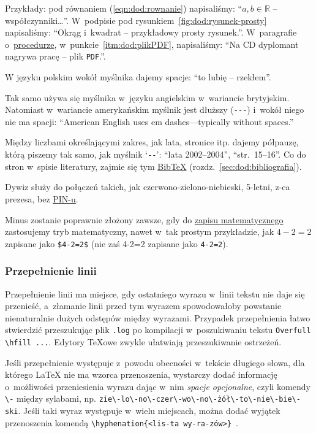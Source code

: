 Przykłady: pod równaniem (\ref{eqn:dod:rownanie}) napisaliśmy: ``$a, b \in \mathbb{R}$ -- współczynniki\dots''. W~podpisie pod rysunkiem~\ref{fig:dod:rysunek-prosty} napisaliśmy: ``Okrąg i~kwadrat -- przykładowy prosty rysunek.''. W~paragrafie o~\hyperref[sec:dod:procedura]{procedurze}, w~punkcie~\ref{itm:dod:plikPDF}, napisaliśmy: ``Na CD dyplomant nagrywa pracę -- plik {\tt PDF}.''.

W języku polskim wokół myślnika dajemy spacje: ``to lubię -- rzekłem''. 

Tak samo używa się myślnika w~języku angielskim w~wariancie brytyjskim. Natomiast w~wariancie amerykańskim myślnik jest dłuższy (\verb+---+) i~wokół niego nie ma spacji: ``American English uses em dashes---typically without spaces.''

Między liczbami określającymi zakres, jak lata, stronice itp. dajemy półpauzę, którą piszemy tak samo, jak myślnik `\verb+--+': ``lata 2002--2004'', ``str.\ 15--16''. Co do stron w~spisie literatury, zajmie się tym \hyperref[sec:dod:bibliografia]{Bib\TeX} (rozdz.~\ref{sec:dod:bibliografia}).

Dywiz służy do połączeń takich, jak czerwono-zielono-niebieski, 5-letni, z-ca prezesa, bez \hyperref[sec:dod:apostrof-dywiz]{PIN-u}.

Minus zostanie poprawnie złożony zawsze, gdy do \hyperref[sec:dod:wzorymat]{zapisu matematycznego} zastosujemy tryb matematyczny, nawet w~tak prostym przykładzie, jak $4-2=2$ zapisane jako \verb+$4-2=2$+ (nie zaś 4-2=2 zapisane jako \verb+4-2=2+). 


\subsubsection{Przepełnienie linii}
\label{sec:dod:przepelnienie}

Przepełnienie linii ma miejsce, gdy ostatniego wyrazu w~linii tekstu nie daje się przenieść, a~złamanie linii przed tym wyrazem spowodowałoby powstanie nienaturalnie dużych odstępów między wyrazami. Przypadek przepełnienia łatwo stwierdzić przeszukując plik {\tt *.log} po kompilacji w~poszukiwaniu tekstu\/ \verb+Overfull \hfill ...+. Edytory \TeX{}owe zwykle ułatwiają przeszukiwanie ostrzeżeń. 

Jeśli przepełnienie występuje z~powodu obecności w~tekście długiego słowa, dla którego \LaTeX{} nie ma wzorca przenoszenia, wystarczy dodać informację o~możliwości przeniesienia wyrazu dając w~nim {\em spacje opcjonalne}, czyli komendy \verb+\-+  między sylabami, np. \verb+zie\-lo\-no\-czer\-wo\-no\-żół\-to\-nie\-bie\-ski+. Jeśli taki wyraz występuje w~wielu miejscach, można dodać wyjątek przenoszenia komendą \verb+\hyphenation{<lis-ta wy-ra-zów>}+~. 

